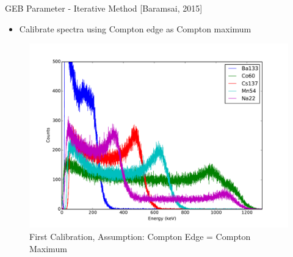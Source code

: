 \documentclass{beamer}
\begin{document}
\begin{frame}{GEB Parameter - Iterative Method [Baramsai, 2015]}
\begin{itemize}
\item Calibrate spectra using Compton edge as Compton maximum
\end{itemize}
\begin{figure}
\vspace*{-0.3cm}
\begin{center}
\includegraphics[scale = 0.28]{1stCalibration}
\caption{\scriptsize{First Calibration, Assumption: Compton Edge = Compton Maximum}}
\end{center}
\end{figure}
\end{frame}
\end{document}
